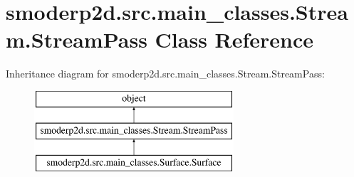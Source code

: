 \hypertarget{classsmoderp2d_1_1src_1_1main__classes_1_1Stream_1_1StreamPass}{\section{smoderp2d.\-src.\-main\-\_\-classes.\-Stream.\-Stream\-Pass Class Reference}
\label{classsmoderp2d_1_1src_1_1main__classes_1_1Stream_1_1StreamPass}
}
Inheritance diagram for smoderp2d.\-src.\-main\-\_\-classes.\-Stream.\-Stream\-Pass\-:\begin{figure}[H]
\begin{center}
\leavevmode
\includegraphics[height=3.000000cm]{db/d7a/classsmoderp2d_1_1src_1_1main__classes_1_1Stream_1_1StreamPass}
\end{center}
\end{figure}
